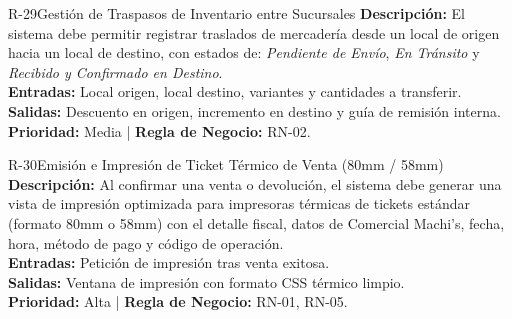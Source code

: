 \begin{reqbox}{R-29}{Gestión de Traspasos de Inventario entre Sucursales}
\textbf{Descripción:} El sistema debe permitir registrar traslados de mercadería desde un local de origen hacia un local de destino, con estados de: \textit{Pendiente de Envío}, \textit{En Tránsito} y \textit{Recibido y Confirmado en Destino}.\\
\textbf{Entradas:} Local origen, local destino, variantes y cantidades a transferir.\\
\textbf{Salidas:} Descuento en origen, incremento en destino y guía de remisión interna.\\
\textbf{Prioridad:} Media | \textbf{Regla de Negocio:} RN-02.
\end{reqbox}

\begin{reqbox}{R-30}{Emisión e Impresión de Ticket Térmico de Venta (80mm / 58mm)}
\textbf{Descripción:} Al confirmar una venta o devolución, el sistema debe generar una vista de impresión optimizada para impresoras térmicas de tickets estándar (formato 80mm o 58mm) con el detalle fiscal, datos de Comercial Machi's, fecha, hora, método de pago y código de operación.\\
\textbf{Entradas:} Petición de impresión tras venta exitosa.\\
\textbf{Salidas:} Ventana de impresión con formato CSS térmico limpio.\\
\textbf{Prioridad:} Alta | \textbf{Regla de Negocio:} RN-01, RN-05.
\end{reqbox}
